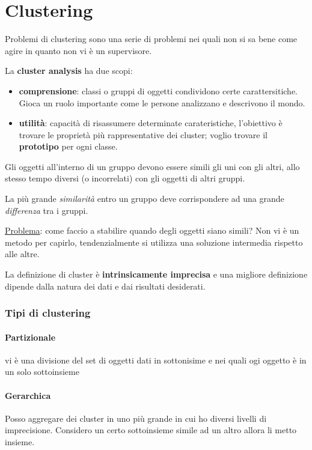  
\section{Clustering}
Problemi di clustering sono una serie di problemi nei quali non si sa bene come agire in quanto non vi \`e un supervisore. 

La \textbf{cluster analysis} ha due scopi: 
\begin{itemize}
	\item \textbf{comprensione}: classi o gruppi di oggetti condividono certe carattersitiche. Gioca un ruolo importante come le persone analizzano e descrivono il mondo. 
	\item \textbf{utilit\`a}: capacit\`a di risassumere determinate carateristiche, l'obiettivo \`e trovare le propriet\`a pi\`u rappresentative dei cluster; voglio trovare il \textbf{prototipo} per ogni classe.
\end{itemize}


Gli oggetti all'interno di un gruppo devono essere simili gli uni con gli altri, allo stesso tempo diversi (o incorrelati) con gli oggetti di altri gruppi.

La pi\`u grande \textit{similarit\`a} entro un gruppo deve corrispondere ad una grande \textit{differenza} tra i gruppi. 

\underline{Problema}: come faccio a stabilire quando degli oggetti siano simili? Non vi \`e un metodo per capirlo, tendenzialmente si utilizza una soluzione intermedia rispetto alle altre. 

La definizione di cluster \`e \textbf{intrinsicamente imprecisa} e una migliore definizione dipende dalla natura dei dati e dai risultati desiderati. 

\subsubsection{Tipi di clustering}

\paragraph{Partizionale}
vi \`e una divisione del set di oggetti dati in sottonisime e nei quali ogi oggetto \`e in un solo sottoinsieme

\paragraph{Gerarchica}
Posso aggregare dei cluster in uno pi\`u grande in cui ho diversi livelli di imprecisione. Considero un certo sottoinsieme simile ad un altro allora li metto insieme.

